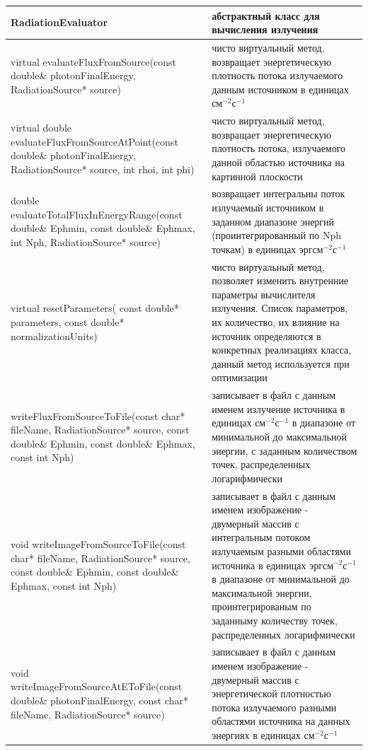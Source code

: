 \begin{small}
	\label{radiationEvaluator}
	\begin{xtabular}{|p{0.5\textwidth}|p{0.5\textwidth}|} 
		\hline
		\textbf{RadiationEvaluator} & абстрактный класс для вычисления излучения \\
		\hline
		virtual evaluateFluxFromSource(const double\& photonFinalEnergy, RadiationSource* source) & чисто виртуальный метод, возвращает энергетическую плотность потока излучаемого данным источником в единицах $\text{см}^{-2} \text{с}^{-1}$ \\
		\hline
		virtual double evaluateFluxFromSourceAtPoint(const double\& photonFinalEnergy, RadiationSource* source, int rhoi, int phi) & чисто виртуальный метод, возвращает энергетическую плотность потока, излучаемого данной областью источника на картинной плоскости\\
		double evaluateTotalFluxInEnergyRange(const double\& Ephmin, const double\& Ephmax, int Nph, RadiationSource* source) & возвращает интегральны поток излучаемый источником в заданном диапазоне энергий (проинтегрированный по Nph точкам) в единицах  $\text{эрг} \text{см}^{-2} \text{с}^{-1}$\\
		\hline
		virtual resetParameters( const double* parameters, const double* normalizationUnits) & чисто виртуальный метод, позволяет изменить внутренние параметры вычислителя излучения. Список параметров, их количество, их влияние на источник определяются  в конкретных реализациях класса, данный метод используется при оптимизации\\
		\hline
		writeFluxFromSourceToFile(const char* fileName, RadiationSource* source, const double\& Ephmin, const double\& Ephmax, const int Nph) & записывает в файл с данным именем излучение источника в единицах $\text{см}^{-2} \text{с}^{-1}$ в диапазоне от минимальной до максимальной энергии, с заданным количеством точек, распределенных логарифмически\\
		\hline
		void writeImageFromSourceToFile(const char* fileName, RadiationSource* source, const double\& Ephmin, const double\& Ephmax, const int Nph) & записывает в файл с данным именем изображение - двумерный массив с интегральным потоком излучаемым разными областями источника в единицах $\text{эрг} \text{см}^{-2} \text{с}^{-1}$ в диапазоне от минимальной до максимальной энергии, проинтегрированым по заданныму количеству точек, распределенных логарифмически\\
		\hline
		void writeImageFromSourceAtEToFile(const double\& photonFinalEnergy, const char* fileName, RadiationSource* source) & записывает в файл с данным именем изображение - двумерный массив с энергетической плотностью потока излучаемого разными областями источника на данных энергиях в единицах $\text{см}^{-2} \text{с}^{-1}$\\

\end{xtabular}
\end{small}
